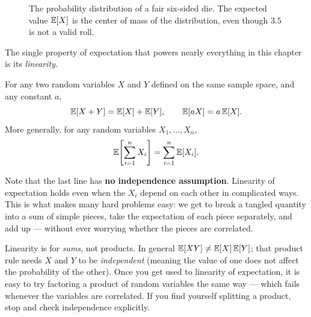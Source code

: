 \begin{figure}[htbp]
\centering
{}
\caption{The probability distribution of a fair six-sided die. The expected value $\mathbb{E}[X]$ is the center of mass of the distribution, even though $3.5$ is not a valid roll.}
\label{ch05:fig-die-expected}
\end{figure}

The single property of expectation that powers nearly everything in this chapter
is its \emph{linearity}.

\begin{theorem}
\label{ch05:thm-linearity}
For any two random variables $X$ and $Y$ defined on the same sample space, and
any constant $a$,
\[
  \mathbb{E}[X + Y] = \mathbb{E}[X] + \mathbb{E}[Y],
  \qquad
  \mathbb{E}[aX] = a\,\mathbb{E}[X].
\]
More generally, for any random variables $X_1, \dots, X_n$,
\[
  \mathbb{E}\!\left[\sum_{i=1}^{n} X_i\right] = \sum_{i=1}^{n} \mathbb{E}[X_i].
\]
\end{theorem}

\begin{focusbox}
Note that the last line has \textbf{no
independence assumption}. Linearity of expectation holds even when the $X_i$
depend on each other in complicated ways. This is what makes many hard
problems easy: we get to break a tangled quantity into a sum of simple
pieces, take the expectation of each piece separately, and add up --- without
ever worrying whether the pieces are correlated.
\end{focusbox}

\begin{trapbox}
Linearity is for \emph{sums}, not products. In general
$\mathbb{E}[XY] \neq \mathbb{E}[X]\,\mathbb{E}[Y]$; that product rule needs $X$ and $Y$ to be
\emph{independent} (meaning the value of one does not affect the probability of the other). Once you get used to linearity of expectation, it is easy to
try factoring a product of random variables the same way --- which fails whenever
the variables are correlated. If you find yourself
splitting a product, stop and check independence explicitly.
\end{trapbox}

